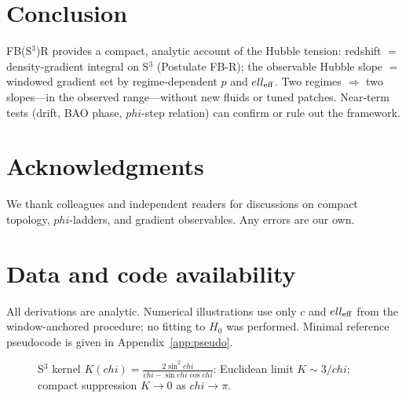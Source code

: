 \documentclass[
  onecolumn,
  amsmath,amssymb,
  aps,
  prd,
  superscriptaddress,
  nofootinbib,
  longbibliography
]{revtex4-2}
\newcommand{\vp}{\varphi}
\def\varphi{phi}%
\def\chi{chi}%
\def\ell{ell}%
\begin{document}
\section{Conclusion}
FB(S$^3$)R provides a compact, analytic account of the Hubble tension: redshift $=$ density-gradient integral on S$^3$ (Postulate FB-R); the observable Hubble slope $=$ windowed gradient set by regime-dependent $p$ and $\ell_{\rm eff}$. Two regimes $\Rightarrow$ two slopes---in the observed range---without new fluids or tuned patches. Near-term tests (drift, BAO phase, $\vp$-step relation) can confirm or rule out the framework.

\section*{Acknowledgments}
We thank colleagues and independent readers for discussions on compact topology, $\vp$-ladders, and gradient observables. Any errors are our own.

\section*{Data and code availability}
All derivations are analytic. Numerical illustrations use only $c$ and $\ell_{\rm eff}$ from the window-anchored procedure; no fitting to $H_0$ was performed. Minimal reference pseudocode is given in Appendix~\ref{app:pseudo}.

\begin{figure}[t]
\centering
{}
\caption{S$^3$ kernel $K(\chi)=\frac{2\sin^2\chi}{\chi-\sin\chi\cos\chi}$: Euclidean limit $K\sim 3/\chi$; compact suppression $K\to 0$ as $\chi\to \pi$.}
\label{fig:kernel}
\end{figure}
\end{document}
